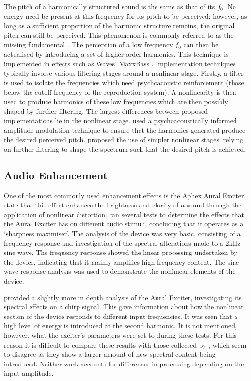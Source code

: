 		The pitch of a harmonically structured sound is the same as that of its $f_{0}$. No energy need be present
		at this frequency for its pitch to be perceived; however, as long as a sufficient proportion of the
		harmonic structure remains, the original pitch can still be perceived. This phenomenon is commonly referred
		to as the missing fundamental \citep{plack2005the}. The perception of a low frequency $f_{0}$ can then be
		actualised by introducing a set of higher order harmonics. This technique is implemented in effects such as
		Waves' MaxxBass \citep{ben-tzur1999the}. Implementation techniques typically involve various filtering
		stages around a nonlinear stage. Firstly, a filter is used to isolate the frequencies which need
		psychoacoustic reinforcement (those below the cutoff frequency of the reproduction system). A nonlinearity
		is then used to produce harmonics of these low frequencies which are then possibly shaped by further
		filtering. The largest differences between proposed implementations lie in the nonlinear stage.
		\citet{gan2001virtual} used a psychoacoustically informed amplitude modulation technique to ensure that the
		harmonics generated produce the desired perceived pitch. \citet{larsen2002reproducing} proposed the use of
		simpler nonlinear stages, relying on further filtering to shape the spectrum such that the desired pitch is
		achieved.

	\subsection{Audio Enhancement}
	\label{sec:Excitation-Uses-Enhancement}
		One of the most commonly used enhancement effects is the Aphex Aural Exciter. \citet{shekar2013modeling}
		state that this effect enhances the brightness and clarity of a sound through the application of nonlinear
		distortion. \citet{chalupper2000aural} ran several tests to determine the effects that the Aural Exciter
		has on different audio stimuli, concluding that it operates as a `sharpness maximiser'. The analysis of the
		device was very basic, consisting of a frequency response and investigation of the spectral alterations
		made to a 2kHz sine wave. The frequency response showed the linear processing undertaken by the device,
		indicating that it mainly amplifies high frequency content. The sine wave response analysis was used to
		demonstrate the nonlinear elements of the device. 

		\citet{dutilleux2011nonlinear} provided a slightly more in depth analysis of the Aural Exciter,
		investigating its spectral effects on a chirp signal. This gave information about how the nonlinear
		section of the device responds to different input frequencies. It was seen that a high level of energy is
		introduced at the second harmonic. It is not mentioned, however, what the exciter's parameters were set to
		during these tests.  For this reason it is difficult to compare these results with those collected by
		\citet{chalupper2000aural}, which seem to disagree as they show a larger amount of new spectral content
		being introduced. Neither work accounts for differences in processing depending on the input amplitude.

